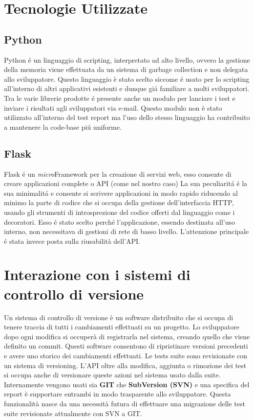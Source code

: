     \section{Tecnologie Utilizzate}  
        \subsection{Python}
            Python \'e un linguaggio di scripting, interpretato ad alto livello, ovvero la gestione della memoria viene effettuata da un sistema di garbage collection e non delegata allo sviluppatore.
            Questo linguaggio è stato scelto siccome \'e usato per lo scripting all'interno di altri applicativi esistenti e dunque gi\'a familiare a molti sviluppatori.
            Tra le varie librerie prodotte \'e presente anche un modulo per lanciare i test e inviare i risultati agli sviluppatori via e-mail.
            Questo modulo non è stato utilizzato all'interno del test report ma l'uso dello stesso linguaggio ha contribuito a mantenere la code-base pi\'u uniforme.
        \subsection{Flask}  
            Flask \'e un \textit{micro}Framework per la creazione di servizi web, esso consente di creare applicazioni complete o API (come nel nostro caso)
            La sua peculiarit\'a \'e la sua minimalit\'a e consente si scrivere applicazioni in modo rapido riducendo al minimo la parte di codice che si occupa della gestione dell'interfaccia HTTP, usando gli strumenti di introsprezione del codice offerti dal linguaggio come i decoratori.
            Esso \'e stato scelto perch\'e l'applicazione, essendo destinata all'uso interno, non necessitava di gestioni di rete di basso livello.
            L'attenzione principale \'e stata invece posta sulla riusabilità dell'API.

    \section{Interazione con i sistemi di controllo di versione}           
        Un sistema di controllo di versione è un software distribuito che si occupa di tenere traccia di tutti i cambiamenti effettuati su un progetto.
        Lo sviluppatore dopo ogni modifica si occuperà di registrarla nel sistema, creando quello che viene definito un commit.
        Questi software consentono di ripristinare versioni precedenti e avere uno storico dei cambiamenti effettuati.
        Le tests suite sono revisionate con un sistema di versioning.
        L'API oltre alla modifica, aggiunta o rimozione dei test si occupa anche di versionare queste azioni nel sistema usato dalla suite.
        Internamente vengono usati sia \textbf{GIT} che \textbf{SubVersion (SVN)} e una specifica del report è supportare entrambi in modo trasparente allo sviluppatore.
        Questa funzionalità nasce da una necessità futura di effettuare una migrazione delle test suite revisionate attualmente con SVN a GIT.
            
